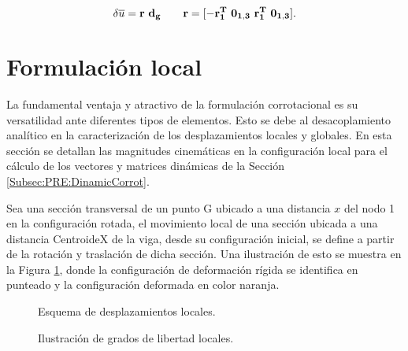 \begin{equation}\label{eq:PRE:DefincionR}
\delta \overline{u} = \bf{r}~ d_g ~~~~~~\bf{r} = [ -\bf{r}_1^T~ \bf{0}_{1,3}~ \bf{r}_1^T~ \bf{0}_{1,3}  ].
\end{equation}

\section{Formulación local}\label{Sec:PRE:LocalFormul}
La fundamental ventaja y atractivo de la formulación corrotacional es su versatilidad ante diferentes tipos de elementos. Esto se debe al desacoplamiento analítico en la caracterización de los desplazamientos locales y globales. En esta sección se detallan las magnitudes cinemáticas en la configuración local para el cálculo de los vectores y matrices dinámicas de la Sección \ref{Subsec:PRE:DinamicCorrot}.

Sea una sección transversal de un punto G ubicado a una distancia $x$ del nodo 1 en la configuración rotada, el movimiento local de una sección ubicada a una distancia \gls{CentroideX} de la viga, desde su configuración inicial, se define a partir de la rotación y traslación de dicha sección. Una ilustración de esto se muestra en la Figura \ref{fig:PRE:IlusLocalDisp}, donde la configuración de deformación rígida se identifica en punteado y la configuración deformada en color naranja.



\begin{figure}[htbp]
	\centering
	\def\svgwidth{100mm}
	
	\caption{Esquema de desplazamientos locales.}
	\label{fig:PRE:IlusLocalDisp}
\end{figure}

\begin{figure}[htbp]
	\centering
	\def\svgwidth{100mm}
 	
	\caption{Ilustración de grados de libertad locales.}
	\label{fig:PRE:IlusLocalAng}
\end{figure}




